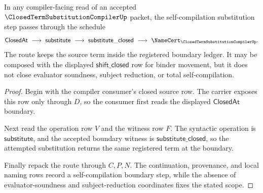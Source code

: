 \begin{theorem}
\label{thm:closed-term-substitution-compiler-self-compile-route}
In any compiler-facing read of an accepted $\ClosedTermSubstitutionCompilerUp$ packet, the self-compilation substitution step passes through the schedule
$$
\begin{gathered}
\mathsf{ClosedAt}\ \longrightarrow\ \mathsf{substitute}\ \longrightarrow\ \mathsf{substitute\_closed}\ \longrightarrow\ \NameCert_{\ClosedTermSubstitutionCompilerUp}.
\end{gathered}
$$
The route keeps the source term inside the registered boundary ledger. It may be composed with the displayed $\mathsf{shift\_closed}$ row for binder movement, but it does not close evaluator soundness, subject reduction, or total self-compilation.
\end{theorem}
\begin{proof}
Begin with the compiler consumer's closed source row. The carrier exposes this row only through $D$, so the consumer first reads the displayed $\mathsf{ClosedAt}$ boundary.

Next read the operation row $V$ and the witness row $F$. The syntactic operation is $\mathsf{substitute}$, and the accepted boundary witness is $\mathsf{substitute\_closed}$, so the attempted substitution returns the same registered term at the boundary.

Finally repack the route through $C,P,N$. The continuation, provenance, and local naming rows record a self-compilation boundary step, while the absence of evaluator-soundness and subject-reduction coordinates fixes the stated scope.
\end{proof}

